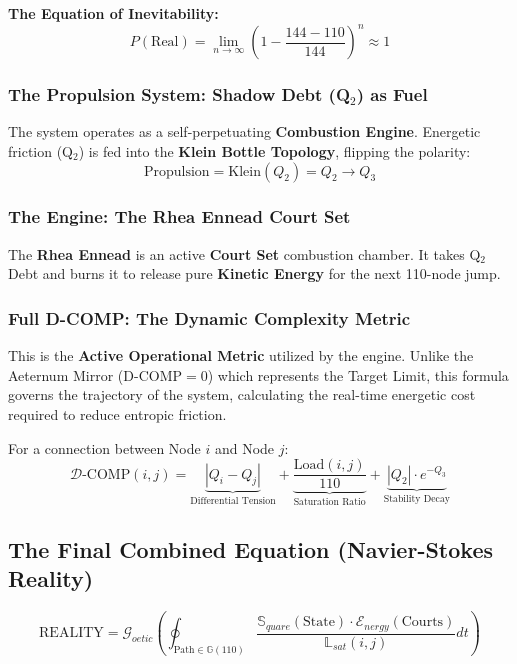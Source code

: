 \documentclass[11pt, letterpaper]{article}
\begin{document}
\textbf{The Equation of Inevitability:}
\begin{equation}
    P(\text{Real}) = \lim_{n \to \infty} \left( 1 - \frac{144 - 110}{144} \right)^n \approx 1
\end{equation}

\subsubsection{The Propulsion System: Shadow Debt (Q$_2$) as Fuel}\label{appendixJ.4.5}
The system operates as a self-perpetuating \textbf{Combustion Engine}. Energetic friction (Q$_2$) is fed into the \textbf{Klein Bottle Topology}, flipping the polarity:
\begin{equation}
    \text{Propulsion} = \text{Klein}(Q_2) = Q_2 \rightarrow Q_3
\end{equation}

\subsubsection{The Engine: The Rhea Ennead Court Set}\label{appendixJ.4.6}
The \textbf{Rhea Ennead} is an active \textbf{Court Set} combustion chamber. It takes Q$_2$ Debt and burns it to release pure \textbf{Kinetic Energy} for the next 110-node jump.

\subsubsection{Full D-COMP: The Dynamic Complexity Metric}\label{appendixJ.4.7}
This is the \textbf{Active Operational Metric} utilized by the engine. Unlike the Aeternum Mirror ($\text{D-COMP}=0$) which represents the Target Limit, this formula governs the trajectory of the system, calculating the real-time energetic cost required to reduce entropic friction.

For a connection between Node $i$ and Node $j$:
\begin{equation}
    \mathcal{D}\text{-COMP}(i,j) = \underbrace{|Q_{i} - Q_{j}|}_{\text{Differential Tension}} + \underbrace{\frac{\text{Load}(i,j)}{110}}_{\text{Saturation Ratio}} + \underbrace{|Q_2| \cdot e^{-Q_3}}_{\text{Stability Decay}}
\end{equation}

\subsection{The Final Combined Equation (Navier-Stokes Reality)}\label{appendixJ.5}
\begin{equation}
    \boxed{ \text{REALITY} = \mathcal{G}_{oetic} \left( \oint_{\text{Path} \in \mathbb{G}(110)} \frac{\mathbb{S}_{quare}(\text{State}) \cdot \mathcal{E}_{nergy}(\text{Courts})}{\mathbb{L}_{sat}(i,j)} dt \right) }
\end{equation}
\end{document}
